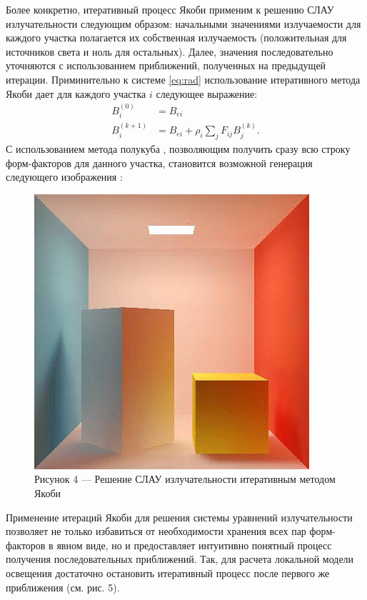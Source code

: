 \documentclass[12pt]{article}
\begin{document}
Более конкретно, итеративный процесс Якоби применим к решению СЛАУ излучательности следующим образом: начальными значениями излучаемости для каждого участка полагается их собственная излучаемость (положительная для источников света и ноль для остальных). Далее, значения последовательно уточняются с использованием приближений, полученных на предыдущей итерации. Приминительно к системе \eqref{eq:rad} использование итеративного метода Якоби дает для каждого участка $i$ следующее выражение:
\begin{equation}
\begin{split}
B_i^{(0)} &= B_{ei}\\
B_i^{(k + 1)} &= B_{ei} + \rho_i \sum_j F_{ij} B_j^{(k)}.\label{eq:iter}
\end{split}
\end{equation}
С использованием метода полукуба \cite{Coh85}, позволяющим получить сразу всю строку форм-факторов для данного участка, становится возможной генерация следующего изображения \cite{Coh85}:
\begin{figure}[h]
\centering
\includegraphics[scale=0.647]{cohen.jpg}
\caption*{Рисунок 4 --- Решение СЛАУ излучательности итеративным методом Якоби}
\end{figure}

Применение итераций Якоби для решения системы уравнений излучательности позволяет не только избавиться от необходимости хранения всех пар форм-факторов в явном виде, но и предоставляет интуитивно понятный процесс получения последовательных приближений. Так, для расчета локальной модели освещения достаточно остановить итеративный процесс после первого же приближения (см. рис. 5).
\end{document}
